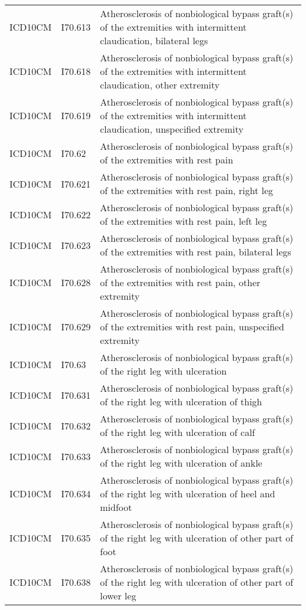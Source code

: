 \begin{longtable}{p{}p{}p{}}
  ICD10CM & I70.613 & Atherosclerosis of nonbiological bypass graft(s) of the extremities with intermittent claudication, bilateral legs \\ 
  ICD10CM & I70.618 & Atherosclerosis of nonbiological bypass graft(s) of the extremities with intermittent claudication, other extremity \\ 
  ICD10CM & I70.619 & Atherosclerosis of nonbiological bypass graft(s) of the extremities with intermittent claudication, unspecified extremity \\ 
  ICD10CM & I70.62 & Atherosclerosis of nonbiological bypass graft(s) of the extremities with rest pain \\ 
  ICD10CM & I70.621 & Atherosclerosis of nonbiological bypass graft(s) of the extremities with rest pain, right leg \\ 
  ICD10CM & I70.622 & Atherosclerosis of nonbiological bypass graft(s) of the extremities with rest pain, left leg \\ 
  ICD10CM & I70.623 & Atherosclerosis of nonbiological bypass graft(s) of the extremities with rest pain, bilateral legs \\ 
  ICD10CM & I70.628 & Atherosclerosis of nonbiological bypass graft(s) of the extremities with rest pain, other extremity \\ 
  ICD10CM & I70.629 & Atherosclerosis of nonbiological bypass graft(s) of the extremities with rest pain, unspecified extremity \\ 
  ICD10CM & I70.63 & Atherosclerosis of nonbiological bypass graft(s) of the right leg with ulceration \\ 
  ICD10CM & I70.631 & Atherosclerosis of nonbiological bypass graft(s) of the right leg with ulceration of thigh \\ 
  ICD10CM & I70.632 & Atherosclerosis of nonbiological bypass graft(s) of the right leg with ulceration of calf \\ 
  ICD10CM & I70.633 & Atherosclerosis of nonbiological bypass graft(s) of the right leg with ulceration of ankle \\ 
  ICD10CM & I70.634 & Atherosclerosis of nonbiological bypass graft(s) of the right leg with ulceration of heel and midfoot \\ 
  ICD10CM & I70.635 & Atherosclerosis of nonbiological bypass graft(s) of the right leg with ulceration of other part of foot \\ 
  ICD10CM & I70.638 & Atherosclerosis of nonbiological bypass graft(s) of the right leg with ulceration of other part of lower leg \\ 

\end{longtable}
